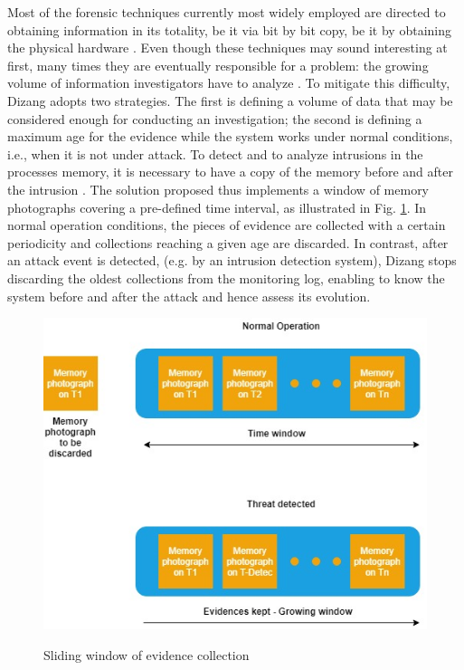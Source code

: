 \documentclass[conference]{IEEEtran}
\newcommand{\fancyname}{Dizang }
\begin{document}
Most of the forensic techniques currently most widely employed are directed to obtaining information in its totality, be it via bit by bit copy, be it by obtaining the physical hardware \cite{Simou_Cloud_Chlng:2014} \cite{Bem_Past_Present_Future:2008}. 
%
Even though these techniques may sound interesting at first, many times they are eventually responsible for a problem: the growing volume of information investigators have to analyze \cite{Quick_Increase_Volume_Impact:2014}.
%
To mitigate this difficulty, \fancyname adopts two strategies. The first is defining a volume of data that may be considered enough for conducting an investigation; the second is defining a maximum age for the evidence while the system works under normal conditions, i.e., when it is not under attack.
%
To detect and to analyze intrusions in the processes memory, it is necessary to have a copy of the memory before and after the intrusion \cite{Case_Memory_Forensics:2014}. 
%
The solution proposed thus implements a window of memory photographs covering a pre-defined time interval, as illustrated in Fig. \ref{fig:janela}. 
%
In normal operation conditions, the pieces of evidence are collected with a certain periodicity and collections reaching a given age are discarded.
%
In contrast, after an attack event is detected, (e.g. by an intrusion detection system), \fancyname stops discarding the oldest collections from the monitoring log, enabling to know the system before and after the attack and hence assess its evolution.
%

\begin{figure}[htb!]
\footnotesize
\caption{Sliding window of evidence collection}
\includegraphics[scale=0.45]{janela_ieee-eng.jpg}
\centering
\label{fig:janela}
\end{figure}
\end{document}
